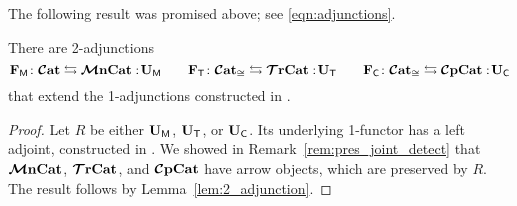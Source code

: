 \documentclass[11pt,oneside,article]{memoir}
\begin{document}
The following result was promised above; see \eqref{eqn:adjunctions}.

\begin{corollary}
      \label{cor:2_adjunctions_MonTrComp}
   There are 2-adjunctions
   \[
      \mathbf{F}_{\mathsf{M}}\colon\bm{\mathcal{C}}\mathbf{at}\leftrightarrows\bm{\mathcal{M}}\mathbf{nCat}:\!\mathbf{U}_{\mathsf{M}}
      \qquad
      \mathbf{F}_{\mathsf{T}}\colon\bm{\mathcal{C}}\mathbf{at}_{\cong}\leftrightarrows\bm{\mathcal{T}}\mathbf{rCat}:\!\mathbf{U}_{\mathsf{T}}
      \qquad
      \mathbf{F}_{\mathsf{C}}\colon\bm{\mathcal{C}}\mathbf{at}_{\cong}\leftrightarrows\bm{\mathcal{C}}\mathbf{pCat}:\!\mathbf{U}_{\mathsf{C}}
   \]
   that extend the 1-adjunctions constructed in \cite{Abramsky2}.
\end{corollary}
\begin{proof}
   Let $R$ be either $\mathbf{U}_{\mathsf{M}}$, $\mathbf{U}_{\mathsf{T}}$, or $\mathbf{U}_{\mathsf{C}}$. Its underlying 1-functor has a left adjoint,
   constructed in \cite{Abramsky2}. We showed in Remark~\ref{rem:pres_joint_detect} that $\bm{\mathcal{M}}\mathbf{nCat}$,
   $\bm{\mathcal{T}}\mathbf{rCat}$, and $\bm{\mathcal{C}}\mathbf{pCat}$ have arrow objects, which are preserved by $R$. The result follows by
   Lemma~\ref{lem:2_adjunction}.
\end{proof}
\end{document}

